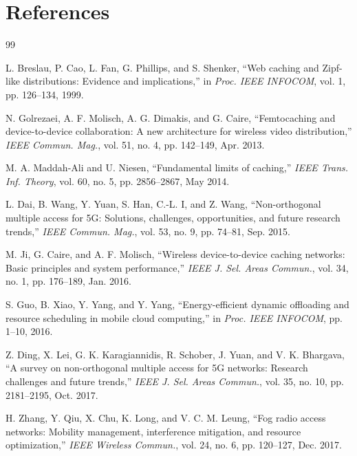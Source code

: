 \documentclass[12pt,a4paper]{article}
\begin{document}
\thispagestyle{plain}



\section*{References}
\justifying

\begin{thebibliography}{99}

L. Breslau, P. Cao, L. Fan, G. Phillips, and S. Shenker, ``Web caching and Zipf-like distributions: Evidence and implications,'' in \textit{Proc. IEEE INFOCOM}, vol. 1, pp. 126--134, 1999.

N. Golrezaei, A. F. Molisch, A. G. Dimakis, and G. Caire, ``Femtocaching and device-to-device collaboration: A new architecture for wireless video distribution,'' \textit{IEEE Commun. Mag.}, vol. 51, no. 4, pp. 142--149, Apr. 2013.

M. A. Maddah-Ali and U. Niesen, ``Fundamental limits of caching,'' \textit{IEEE Trans. Inf. Theory}, vol. 60, no. 5, pp. 2856--2867, May 2014.

L. Dai, B. Wang, Y. Yuan, S. Han, C.-L. I, and Z. Wang, ``Non-orthogonal multiple access for 5G: Solutions, challenges, opportunities, and future research trends,'' \textit{IEEE Commun. Mag.}, vol. 53, no. 9, pp. 74--81, Sep. 2015.

M. Ji, G. Caire, and A. F. Molisch, ``Wireless device-to-device caching networks: Basic principles and system performance,'' \textit{IEEE J. Sel. Areas Commun.}, vol. 34, no. 1, pp. 176--189, Jan. 2016.

S. Guo, B. Xiao, Y. Yang, and Y. Yang, ``Energy-efficient dynamic offloading and resource scheduling in mobile cloud computing,'' in \textit{Proc. IEEE INFOCOM}, pp. 1--10, 2016.

Z. Ding, X. Lei, G. K. Karagiannidis, R. Schober, J. Yuan, and V. K. Bhargava, ``A survey on non-orthogonal multiple access for 5G networks: Research challenges and future trends,'' \textit{IEEE J. Sel. Areas Commun.}, vol. 35, no. 10, pp. 2181--2195, Oct. 2017.

H. Zhang, Y. Qiu, X. Chu, K. Long, and V. C. M. Leung, ``Fog radio access networks: Mobility management, interference mitigation, and resource optimization,'' \textit{IEEE Wireless Commun.}, vol. 24, no. 6, pp. 120--127, Dec. 2017.


\end{thebibliography}
\end{document}
